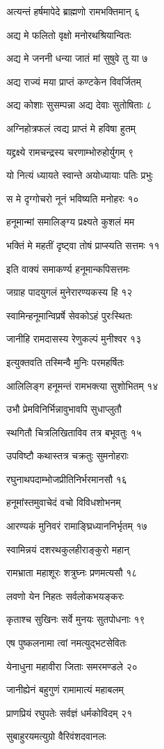 अत्यन्तं हर्षमापेदे ब्राह्मणो रामभक्तिमान् ६

अद्य मे फलितो वृक्षो मनोरथश्रियान्वितः

अद्य मे जननी धन्या जातं मां सुषुवे तु या ७

अद्य राज्यं मया प्राप्तं कण्टकेन विवर्जितम्

अद्य कोशाः सुसम्पन्ना अद्य देवाः सुतोषिताः ८

अग्निहोत्रफलं त्वद्य प्राप्तं मे हविषा हुतम्

यद्द्रक्ष्ये रामचन्द्रस्य चरणाम्भोरुहोर्युगम् ९

यो नित्यं ध्यायते स्वान्ते अयोध्यायाः पतिः प्रभुः

स मे दृग्गोचरो नूनं भविष्यति मनोहरः १०

हनूमान्मां समालिङ्ग्य प्रक्ष्यते कुशलं मम

भक्तिं मे महतीं दृष्ट्वा तोषं प्राप्स्यति सत्तमः ११

इति वाक्यं समाकर्ण्य हनूमान्कपिसत्तमः

जग्राह पादयुगलं मुनेरारण्यकस्य हि १२

स्वामिन्हनूमान्विप्रर्षे सेवकोऽहं पुरःस्थितः

जानीहि रामदासस्य रेणुकल्पं मुनीश्वर १३

इत्युक्तवति तस्मिन्वै मुनिः परमहर्षितः

आलिलिङ्ग हनूमन्तं रामभक्त्या सुशोभितम् १४

उभौ प्रेमविनिर्भिन्नावुभावपि सुधाप्लुतौ

स्थगितौ चित्रलिखिताविव तत्र बभूवतुः १५

उपविष्टौ कथास्तत्र चक्रतुः सुमनोहराः

रघुनाथपदाम्भोजप्रीतिनिर्भरमानसौ १६

हनूमांस्तमुवाचेदं वचो विविधशोभनम्

आरण्यकं मुनिवरं रामाङ्घ्रिध्याननिर्भृतम् १७

स्वामिन्नयं दशरथकुलहीराङ्कुरो महान्

रामभ्राता महाशूरः शत्रुघ्नः प्रणमत्यसौ १८

लवणो येन निहतः सर्वलोकभयङ्करः

कृताश्च सुखिनः सर्वे मुनयः सुतपोधनाः १९

एष पुष्कलनामा त्वां नमत्युद्भटसेवितः

येनाधुना महावीरा जिताः समरमण्डले २०

जानीह्येनं बहुगुणं रामामात्यं महाबलम्

प्राणप्रियं रघुपतेः सर्वज्ञं धर्मकोविदम् २१

सुबाहुरयमत्युग्रो वैरिवंशदवानलः

